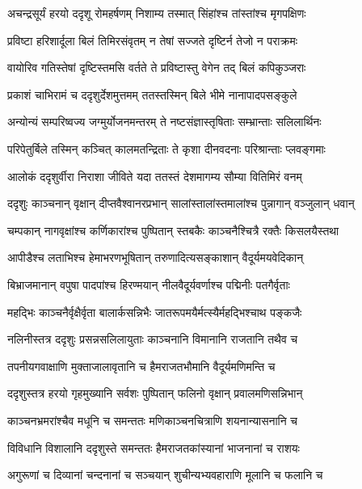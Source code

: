 \twolineshloka
{अचन्द्रसूर्यं हरयो ददृशू रोमहर्षणम्}
{निशाम्य तस्मात् सिंहांश्च तांस्तांश्च मृगपक्षिणः} %

\twolineshloka
{प्रविष्टा हरिशार्दूला बिलं तिमिरसंवृतम्}
{न तेषां सज्जते दृष्टिर्न तेजो न पराक्रमः} %

\twolineshloka
{वायोरिव गतिस्तेषां दृष्टिस्तमसि वर्तते}
{ते प्रविष्टास्तु वेगेन तद् बिलं कपिकुञ्जराः} %

\twolineshloka
{प्रकाशं चाभिरामं च ददृशुर्देशमुत्तमम्}
{ततस्तस्मिन् बिले भीमे नानापादपसङ्कुले} %

\twolineshloka
{अन्योन्यं सम्परिष्वज्य जग्मुर्योजनमन्तरम्}
{ते नष्टसंज्ञास्तृषिताः सम्भ्रान्ताः सलिलार्थिनः} %

\twolineshloka
{परिपेतुर्बिले तस्मिन् कञ्चित् कालमतन्द्रिताः}
{ते कृशा दीनवदनाः परिश्रान्ताः प्लवङ्गमाः} %

\twolineshloka
{आलोकं ददृशुर्वीरा निराशा जीविते यदा}
{ततस्तं देशमागम्य सौम्या वितिमिरं वनम्} %

\twolineshloka
{ददृशुः काञ्चनान् वृक्षान् दीप्तवैश्वानरप्रभान्}
{सालांस्तालांस्तमालांश्च पुन्नागान् वञ्जुलान् धवान्} %

\twolineshloka
{चम्पकान् नागवृक्षांश्च कर्णिकारांश्च पुष्पितान्}
{स्तबकैः काञ्चनैश्चित्रै रक्तैः किसलयैस्तथा} %

\twolineshloka
{आपीडैश्च लताभिश्च हेमाभरणभूषितान्}
{तरुणादित्यसङ्काशान् वैदूर्यमयवेदिकान्} %

\twolineshloka
{बिभ्राजमानान् वपुषा पादपांश्च हिरण्मयान्}
{नीलवैदूर्यवर्णाश्च पद्मिनीः पतगैर्वृताः} %

\twolineshloka
{महद्भिः काञ्चनैर्वृक्षैर्वृता बालार्कसन्निभैः}
{जातरूपमयैर्मत्स्यैर्महद्भिश्चाथ पङ्कजैः} %

\twolineshloka
{नलिनीस्तत्र ददृशुः प्रसन्नसलिलायुताः}
{काञ्चनानि विमानानि राजतानि तथैव च} %

\twolineshloka
{तपनीयगवाक्षाणि मुक्ताजालावृतानि च}
{हैमराजतभौमानि वैदूर्यमणिमन्ति च} %

\twolineshloka
{ददृशुस्तत्र हरयो गृहमुख्यानि सर्वशः}
{पुष्पितान् फलिनो वृक्षान् प्रवालमणिसन्निभान्} %

\twolineshloka
{काञ्चनभ्रमरांश्चैव मधूनि च समन्ततः}
{मणिकाञ्चनचित्राणि शयनान्यासनानि च} %

\twolineshloka
{विविधानि विशालानि ददृशुस्ते समन्ततः}
{हैमराजतकांस्यानां भाजनानां च राशयः} %

\twolineshloka
{अगुरूणां च दिव्यानां चन्दनानां च सञ्चयान्}
{शुचीन्यभ्यवहाराणि मूलानि च फलानि च} %

